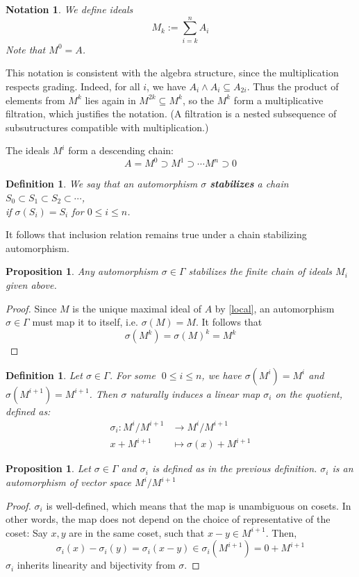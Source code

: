 \documentclass[12pt]{article}
\newtheorem{proposition}[theorem]{Proposition}
\newtheorem{definition}[theorem]{Definition}
\newtheorem{notation}[theorem]{Notation}
\numberwithin{theorem}{section}
\numberwithin{equation}{theorem}
\begin{document}
\begin{notation}
    We define ideals $$M_k := \sum_{i = k}^n A_i$$ Note that $M^0 = A$.
\end{notation}

This notation is consistent with the algebra structure, since the multiplication respects grading. Indeed, for all $i$, we have $A_i \wedge A_i \subseteq A_{2i}$. Thus the product of elements from $M^k$ lies again in $M^{2k} \subseteq M^k$, so the $M^k$ form a multiplicative filtration, which justifies the notation.
(A filtration is a nested subsequence of subsutructures compatible with multiplication.)

The ideals $M^i$ form a descending chain:
$$A = M^0 \supset M^1 \supset \cdots M^n \supset 0$$

\begin{definition}
    We say that an automorphism $\sigma$ \textbf{stabilizes} a chain $S_0 \subset S_1 \subset S_2 \subset \cdots$,\\ if $\sigma(S_i) = S_i$ for $0 \le i \le n$.
\end{definition}
It follows that inclusion relation remains true under a chain stabilizing automorphism.

\begin{proposition}    
    Any automorphism $\sigma \in \Gamma$ stabilizes the finite chain of ideals $M_i$ given above. 
\end{proposition}
\begin{proof}
    Since $M$ is the unique maximal ideal of $A$ by \ref{local}, an automorphism $\sigma \in \Gamma$ must map it to itself, i.e. $\sigma(M) = M$. It follows that $$\sigma(M^k) = \sigma(M)^k = M^k$$ 
\end{proof}

\begin{definition}
    Let $\sigma \in \Gamma$. For some $\;0 \le i \le n$, we have $\sigma(M^i) = M^i$ and $\sigma(M^{i+1}) = M^{i+1}$. Then $\sigma$ naturally induces a linear map $\sigma_i$ on the quotient, defined as:
    \begin{align*}
        \sigma_i : M^i/M^{i+1} &\to M^i/M^{i+1}\\
        x + M^{i+1} &\mapsto \sigma(x) + M^{i+1}
    \end{align*}    
\end{definition}

\begin{proposition}
    Let $\sigma \in \Gamma$ and $\sigma_i$ is defined as in the previous definition. $\sigma_i$ is an automorphism of vector space $M^i/M^{i+1}$
\end{proposition}
\begin{proof}
    $\sigma_i$ is well-defined, which means that the map is unambiguous on cosets. In other words, the map does not depend on the choice of representative of the coset: Say $x, y$ are in the same coset, such that $x-y \in M^{i+1}$. Then, $$\sigma_i(x) - \sigma_i(y) = \sigma_i(x-y) \in \sigma_i(M^{i+1}) = 0 + M^{i+1} $$
    $\sigma_i$ inherits linearity and bijectivity from $\sigma$.
\end{proof}
\end{document}
